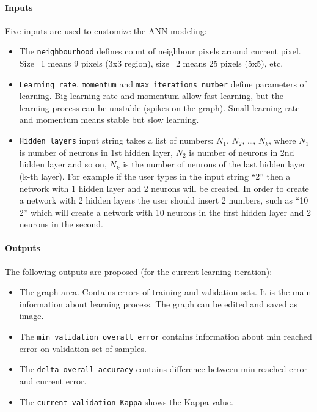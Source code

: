 \documentclass{report}
\begin{document}
\paragraph{Inputs} Five inputs are used to customize the ANN modeling:
\begin{itemize}
  \item The \verb+neighbourhood+ defines count of neighbour pixels around current pixel. Size=1 means 9
    pixels (3x3 region), size=2 means 25 pixels (5x5), etc.
  \item \verb+Learning rate+, \verb+momentum+ and \verb+max iterations number+ define parameters of learning. Big
    learning rate and momentum allow fast learning, but the learning process can be unstable
    (spikes on the graph). Small learning rate and momentum means stable but slow learning.
  \item \verb+Hidden layers+ input string takes a list of numbers: $N_1$, $N_2$,  \dots, $N_k$, where $N_1$ is number of
    neurons in 1st hidden layer, $N_2$ is number of neurons in 2nd hidden layer and so on, $N_k$ is the
    number of neurons of the last hidden layer (k-th layer). For example if the user types in the
    input string “2” then a network with 1 hidden layer and 2 neurons will be created. In order to
    create a network with 2 hidden layers the user should insert 2 numbers, such as “10 2”
    which will create a network with 10 neurons in the first hidden layer and 2 neurons in the
    second.
\end{itemize}


\paragraph{Outputs} The following outputs are proposed (for the current learning iteration):
\begin{itemize}
  \item The graph area. Contains errors of training and validation sets. It is the main information
about learning process. The graph can be edited and saved as image.
  \item The \verb+min validation overall error+ contains information about min reached error on validation
set of samples.
  \item The \verb+delta overall accuracy+ contains difference between min reached error and current error.
  \item The \verb+current validation Kappa+ shows the Kappa value.
\end{itemize}
\end{document}
